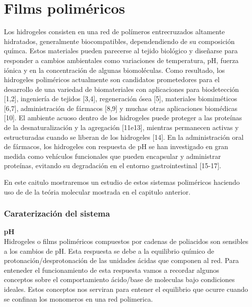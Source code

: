 
\chapter{Films polim\'ericos} %

\label{Chapter2} %



Los hidrogeles consisten en una red de pol\'imeros entrecruzados altamente hidratados, generalmente biocompatibles, dependendiendo de su composici\'on qu\'imca. Estos materiales pueden parecerse al tejido biol\'ogico y dise\~narse para responder a cambios ambientales como variaciones de temperatura, pH, fuerza i\'onica y en la concentraci\'on de algunas biomol\'eculas. Como resultado, los hidrogeles polim\'ericos actualmente son candidatos prometedores para el desarrollo de una variedad de biomateriales con aplicaciones para biodetección [1,2], ingenier\'ia de tejidos [3,4], regeneraci\'on \'osea [5], materiales biomim\'eticos [6,7], administraci\'on de f\'armacos [8,9] y muchas otras aplicaciones biom\'edicas [10]. El ambiente acuoso dentro de los hidrogeles puede proteger a las prote\'inas de la desnaturalización y la agregaci\'on [11e13], mientras permanecen activas y estructuradas cuando se liberan de los hidrogeles [14]. En la administraci\'on oral de f\'armacos, los hidrogeles con respuesta de pH se han investigado en gran medida como veh\'iculos funcionales que pueden encapsular y administrar prote\'inas, evitando su degradaci\'on en el entorno gastrointestinal [15-17].


En este caitulo mostraremos un estudio  de estos sistemas polim\'ericos haciendo uso de de la te\'oria molecular mostrada en el capitulo anterior. 



\subsection{Caraterizaci\'on del sistema}
\textbf{pH} \\
Hidrogeles o films polim\'ericos compuestos por cadenas de poliacidos son sensibles a los cambios de pH. Esta respuesta se debe a la equilibrio qu\'imico de protonaci\'on/desprotonaci\'on de las unidades \'acidas que componen al red. 
Para enteneder el funcionamiento de esta respuesta vamos a recordar algunos conceptos sobre el comportamiento \'acido/base de moleculas bajo condiciones ideales. 
Estos conceptos nos serviran para entener el equilibrio que ocurre cuando se confinan los monomeros en una red polimerica.

